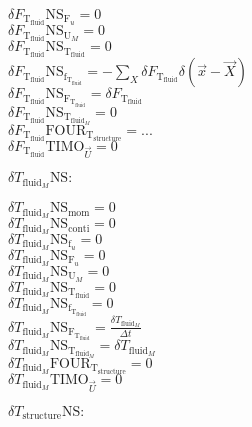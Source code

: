 \documentclass[10pt]{article} %
\begin{document}
\begin{center}
	$\delta F_{\text{T}_{\text{fluid}}} \text{NS}_{\text{F}_u} = 0$\\
	$\delta F_{\text{T}_{\text{fluid}}} \text{NS}_{\text{U}_M} = 0$\\
	$\delta F_{\text{T}_{\text{fluid}}} \text{NS}_{\text{T}_{\text{fluid}}} = 0 $\\
	$\delta F_{\text{T}_{\text{fluid}}} \text{NS}_{\text{f}_{\text{T}_{\text{fluid}}}} = -\sum_X \delta F_{\text{T}_{\text{fluid}}} \delta (\vec{x}-\vec{X})$\\
	$\delta F_{\text{T}_{\text{fluid}}} \text{NS}_{\text{F}_{\text{T}_{\text{fluid}}}} = \delta F_{\text{T}_{\text{fluid}}}$\\
	$\delta F_{\text{T}_{\text{fluid}}} \text{NS}_{\text{T}_{\text{fluid}_M}} = 0$\\
	$\delta F_{\text{T}_{\text{fluid}}} \text{FOUR}_{\text{T}_{\text{structure}}} = ...$\\
	$\delta F_{\text{T}_{\text{fluid}}} \text{TIMO}_{\vec{U}} = 0$\\
\begin{flushleft}
	$\delta T_{\text{fluid}_M} \text{NS}:$
\end{flushleft}
	$\delta T_{\text{fluid}_M} \text{NS}_{\text{mom}} =  0$\\
	$\delta T_{\text{fluid}_M} \text{NS}_{\text{conti}} = 0$\\
	$\delta T_{\text{fluid}_M} \text{NS}_{\text{f}_u} = 0$\\
	$\delta T_{\text{fluid}_M} \text{NS}_{\text{F}_u} = 0$\\
	$\delta T_{\text{fluid}_M} \text{NS}_{\text{U}_M} = 0$\\
	$\delta T_{\text{fluid}_M} \text{NS}_{\text{T}_{\text{fluid}}} = 0$\\
	$\delta T_{\text{fluid}_M} \text{NS}_{\text{f}_{\text{T}_{\text{fluid}}}} = 0$\\
	$\delta T_{\text{fluid}_M} \text{NS}_{\text{F}_{\text{T}_{\text{fluid}}}} = \frac{\delta T_{\text{fluid}_M}}{\Delta t}$\\
	$\delta T_{\text{fluid}_M} \text{NS}_{\text{T}_{\text{fluid}_M}} = \delta T_{\text{fluid}_M}$\\
	$\delta T_{\text{fluid}_M} \text{FOUR}_{\text{T}_{\text{structure}}} = 0$\\
	$\delta T_{\text{fluid}_M} \text{TIMO}_{\vec{U}} = 0$\\
\begin{flushleft}
	$\delta T_{\text{structure}} \text{NS}:$
\end{flushleft}

\end{center}
\end{document}
